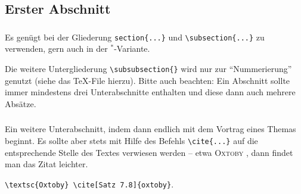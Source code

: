 \thispagestyle{empty}
\begin{abstract}
\noindent
Hier steht eine kurze Zusammenfassung des Inhalts des Vortrags oder der Hausarbeit.
Dazu dieses \TeX{}-File kopieren und umbenennen.
Weitergehende Literatur ist im  Literatur\-verzeichnis aufgeführt, wobei ich das Buch von \textsc{Voss} \cite{voss-wiss} empfehlen kann.
Für einen Einstieg empfehle ich \emph{l2kurz.pdf}, das man auf 
%
\begin{center}
\texttt{http://mirror.ctan.org/info/lshort/german/} 
\end{center}
%
findet.
Weiteres in meinem Erläuterungen \emph{Sem-ReadMe.md}.
Ein Teil der hier angegeben Literatur und weiteres findet sich auf ILIAS \bzw in dem \og PDF.
\end{abstract}
%
\subsection{Erster Abschnitt}\label{sec:erster-abschnitt}
\subsubsection{}
Es genügt bei der Gliederung \verb|section{...}| und \verb|\subsection{...}| zu verwenden, gern auch in der $ ^{*} $-Variante.

Die weitere Untergliederung \verb|\subsubsection{}| wird nur zur \enquote{Nummerierung} genutzt (siehe das \TeX{}-File hierzu).
Bitte auch beachten: Ein Abschnitt sollte immer mindestens drei Unterabschnitte enthalten und diese dann auch mehrere Absätze. 

%
\subsubsection{} 
Ein weitere Unterabschnitt, indem dann endlich mit dem Vortrag eines Themas beginnt. 
Es sollte aber stets mit Hilfe des Befehls \verb|\cite{...}| auf die entsprechende Stelle des Textes verwiesen werden -- etwa \textsc{Oxtoby} \cite[Satz 7.8]{oxtoby}, dann findet man das Zitat leichter. 
%
\begin{center}
\verb|\textsc{Oxtoby} \cite[Satz 7.8]{oxtoby}|.
\end{center}
%
